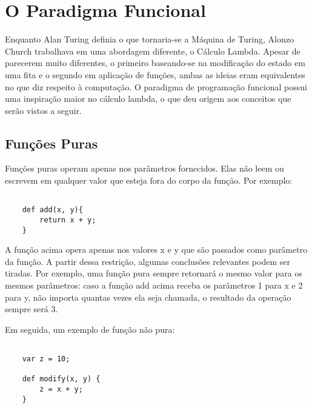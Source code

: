 \chapter{O Paradigma Funcional}



Enquanto Alan Turing definia o que 
tornaria-se a Máquina de Turing, Alonzo Church 
trabalhava em uma abordagem diferente, o Cálculo Lambda\cite{church1932set,church1936unsolvable,sep-turing-machine}. 
Apesar de parecerem muito diferentes, o primeiro baseando-se 
na modificação do estado em uma fita e o segundo 
em aplicação de funções, ambas as ideias eram 
equivalentes no que diz respeito à computação\cite{sep-church-turing}. 
O paradigma de programação funcional possui uma inspiração 
maior no cálculo lambda, o que deu origem aos conceitos 
que serão vistos a seguir.





\section{Funções Puras}

Funções puras operam apenas nos parâmetros fornecidos. 
Elas não leem ou escrevem em qualquer valor que esteja 
fora do corpo da função\cite{purefunctionscala, functionalscala}. Por exemplo:

\begin{lstlisting}[caption={Exemplo de Função Pura},label=purefunction]

    def add(x, y){
        return x + y;
    }

\end{lstlisting}

A função acima opera apenas nos valores x e y que 
são passados como parâmetro da função. A partir 
dessa restrição, algumas conclusões relevantes podem 
ser tiradas. Por exemplo, uma função pura sempre 
retornará o mesmo valor para os mesmos parâmetros: 
caso a função add acima receba os parâmetros 1 para x 
e 2 para y, não importa quantas vezes ela seja chamada, 
o resultado da operação sempre será 3\cite{functionalscala}.

Em seguida, um exemplo de função não pura:

\begin{lstlisting}[caption={Exemplo de Função Pura},label=purefunction]

    var z = 10;

    def modify(x, y) {
        z = x + y;
    }

\end{lstlisting}

